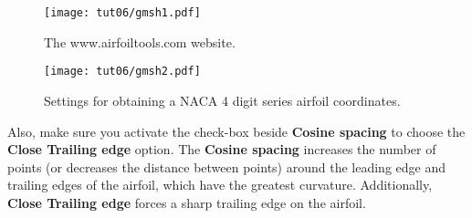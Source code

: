 \begin{figure}[htbp]
    \centering
    \texttt{[image: tut06/gmsh1.pdf]}
    \caption{The www.airfoiltools.com website.}
    \label{fig6:gmsh1}
\end{figure}
\begin{figure}[htbp]
    \centering
    \texttt{[image: tut06/gmsh2.pdf]}
    \caption{Settings for obtaining a NACA 4 digit series airfoil coordinates.}
    \label{fig6:gmsh2}
\end{figure}
Also, make sure you activate the check-box beside \textbf{Cosine spacing} to choose the \textbf{Close Trailing edge} option. The \textbf{Cosine spacing} increases the number of points (or decreases the distance between points) around the leading edge and trailing edges of the airfoil, which have the greatest curvature. Additionally, \textbf{Close Trailing edge} forces a sharp trailing edge on the airfoil.
